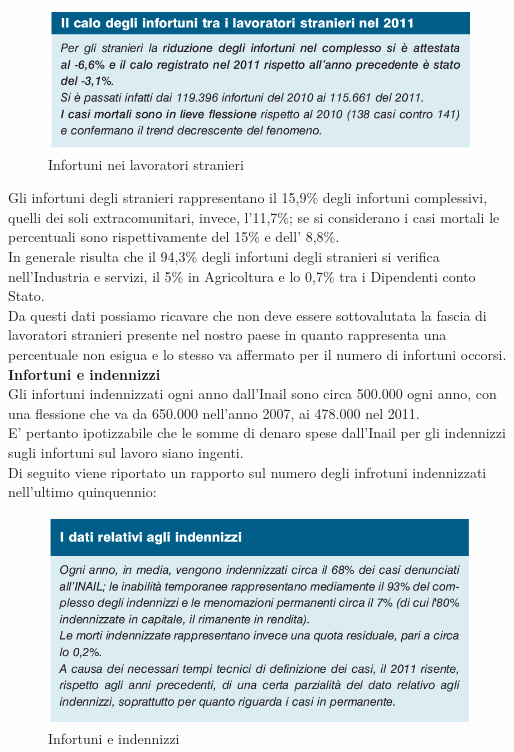 \begin{figure}[H]
\centering
\includegraphics[scale=0.55]{images/cap4/analisiDiMercato/lavoratoriStranieri2}
\caption{Infortuni nei lavoratori stranieri}
\end{figure}



Gli infortuni degli stranieri rappresentano il 15,9\% degli infortuni complessivi, quelli dei
soli extracomunitari, invece, l’11,7\%; se si considerano i casi mortali le percentuali sono
rispettivamente del 15\% e dell’ 8,8\%.\\
In generale risulta che il 94,3\% degli infortuni degli stranieri si verifica nell’Industria e
servizi, il 5\% in Agricoltura e lo 0,7\% tra i Dipendenti conto Stato.\\
Da questi dati possiamo ricavare che non deve essere sottovalutata la fascia di lavoratori stranieri presente nel nostro paese in quanto rappresenta una percentuale non esigua e lo stesso va affermato per il numero di infortuni occorsi.\\



\textbf{Infortuni e indennizzi}\\
Gli infortuni indennizzati ogni anno dall'Inail sono circa 500.000 ogni anno, con una flessione che va da 650.000 nell'anno 2007, ai 478.000 nel 2011.\\
E' pertanto ipotizzabile che le somme di denaro spese dall'Inail per gli indennizzi sugli infortuni sul lavoro siano ingenti.\\
Di seguito viene riportato un rapporto sul numero degli infrotuni indennizzati nell'ultimo quinquennio:

\begin{figure}[H]
\centering
\includegraphics[scale=0.55]{images/cap4/analisiDiMercato/infortuniIndennizzi1}
\caption{Infortuni e indennizzi}
\end{figure}

